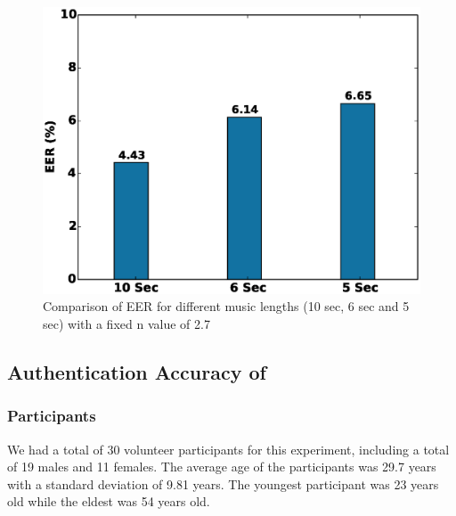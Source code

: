 
\begin{figure}[t]
\centering
\includegraphics [width=\columnwidth]{figure/exp2_eer_vary_length.eps}
\caption{Comparison of EER for different music lengths (10 sec, 6 sec and 5
sec) with a fixed n value of 2.7}
\label{fig:eer-length}
\end{figure}




\subsection{Authentication Accuracy of \systemname}

\subsubsection{Participants}
We had a total of 30 volunteer participants for this experiment, including a total of 19 males and 11 females.
The average age of the participants was 29.7 years with a standard deviation
of 9.81 years. The youngest participant was 23 years old while the eldest was
54 years old.

